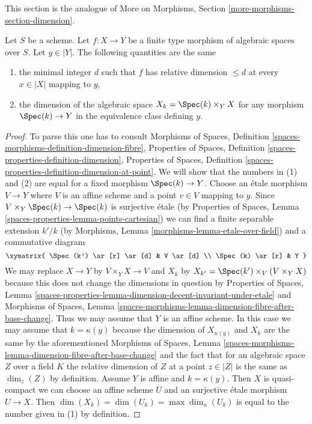 \noindent
This section is the analogue of
More on Morphisms, Section \ref{more-morphisms-section-dimension}.

\begin{lemma}
\label{lemma-dimension-fibre}
Let $S$ be a scheme. Let $f : X \to Y$ be a finite type morphism of
algebraic spaces over $S$. Let $y \in |Y|$. The following quantities
are the same
\begin{enumerate}
\item the minimal integer $d$ such that $f$ has relative dimension $\leq d$
at every $x \in |X|$ mapping to $y$,
\item the dimension of the algebraic space $X_k = \Spec(k) \times_Y X$
for any morphism $\Spec(k) \to Y$ in the equivalence class defining $y$.
\end{enumerate}
\end{lemma}

\begin{proof}
To parse this one has to consult
Morphisms of Spaces, Definition
\ref{spaces-morphisms-definition-dimension-fibre},
Properties of Spaces,
Definition \ref{spaces-properties-definition-dimension},
Properties of Spaces,
Definition \ref{spaces-properties-definition-dimension-at-point}.
We will show that the numbers in (1) and (2) are equal for
a fixed morphism $\Spec(k) \to Y$.
Choose an \'etale morphism $V \to Y$ where $V$ is an affine
scheme and a point $v \in V$ mapping to $y$.
Since $V \times_Y \Spec(k) \to \Spec(k)$ is surjective \'etale
(by Properties of Spaces, Lemma \ref{spaces-properties-lemma-points-cartesian})
we can find a finite separable extension $k'/k$
(by Morphisms, Lemma \ref{morphisms-lemma-etale-over-field})
and a commutative diagram
$$
\xymatrix{
\Spec(k') \ar[r] \ar[d] & V \ar[d] \\
\Spec(k) \ar[r] & Y
}
$$
We may replace $X \to Y$ by $V \times_Y X \to V$ and
$X_k$ by $X_{k'} = \Spec(k') \times_V (V \times_Y X)$
because this does not change the dimensions in question by
Properties of Spaces, Lemma
\ref{spaces-properties-lemma-dimension-decent-invariant-under-etale}
and Morphisms of Spaces, Lemma
\ref{spaces-morphisms-lemma-dimension-fibre-after-base-change}.
Thus we may assume that $Y$ is an affine scheme.
In this case we may assume that $k = \kappa(y)$
because the dimension of $X_{\kappa(y)}$ and $X_k$
are the same by the aforementioned Morphisms of Spaces, Lemma
\ref{spaces-morphisms-lemma-dimension-fibre-after-base-change}
and the fact that for an algebraic space $Z$ over a field $K$ the
relative dimension of $Z$ at a point $z \in |Z|$
is the same as $\dim_z(Z)$ by definition.
Assume $Y$ is affine and $k = \kappa(y)$. Then
$X$ is quasi-compact we can choose an affine scheme $U$ and
an surjective \'etale morphism $U \to X$.
Then $\dim(X_k) = \dim(U_k) = \max \dim_u(U_k)$
is equal to the number given in (1) by definition.
\end{proof}


